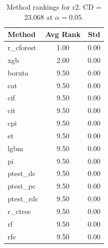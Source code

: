 \begin{table}[h]
\centering
\caption{Method rankings for r2. CD = 23.068 at $\alpha=0.05$.}
\label{tab:ranks_r2}
\begin{tabular}{lcc}
\toprule
Method & Avg Rank & Std \\
\midrule
r_cforest & 1.00 & 0.00 \\
xgb & 2.00 & 0.00 \\
boruta & 9.50 & 0.00 \\
cat & 9.50 & 0.00 \\
cif & 9.50 & 0.00 \\
cit & 9.50 & 0.00 \\
cpi & 9.50 & 0.00 \\
et & 9.50 & 0.00 \\
lgbm & 9.50 & 0.00 \\
pi & 9.50 & 0.00 \\
ptest_dc & 9.50 & 0.00 \\
ptest_pc & 9.50 & 0.00 \\
ptest_rdc & 9.50 & 0.00 \\
r_ctree & 9.50 & 0.00 \\
rf & 9.50 & 0.00 \\
rfe & 9.50 & 0.00 \\
\bottomrule
\end{tabular}
\end{table}